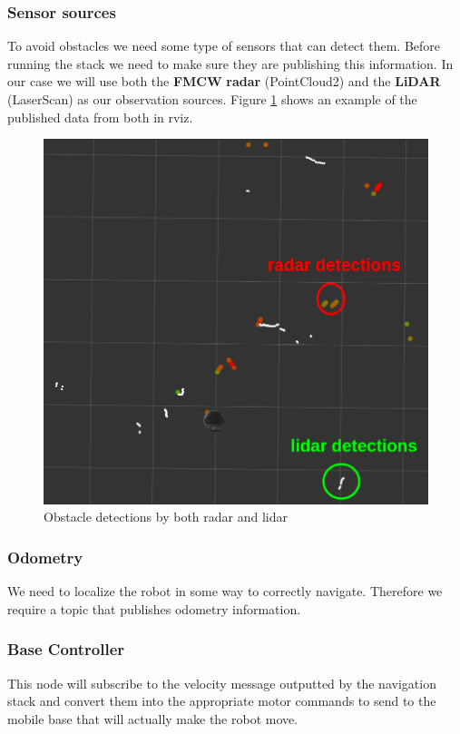 \subsubsection{Sensor sources}
To avoid obstacles we need some type of sensors that can detect them. Before running the stack we need to make sure they are publishing this information.
In our case we will use both the \textbf{\ac{FMCW}} \textbf{\ac{radar}} (PointCloud2) and the \textbf{\ac{LiDAR}} (LaserScan) as our observation sources.
Figure \ref{fig:sensors} shows an example of the published data from both in rviz.
\begin{figure}[!htb]
    \centering
    \includegraphics[scale=0.5]{imgs/chapter3/sensors2.png}
    \caption{Obstacle detections by both radar and lidar}
    \label{fig:sensors}
\end{figure}
\subsubsection{Odometry}
We need to localize the robot in some way to correctly navigate. Therefore we require a topic that publishes odometry information.
\subsubsection{Base Controller}
This node will subscribe to the velocity message outputted by the navigation stack and convert them into the appropriate motor commands to send to the mobile base that will actually make the robot move.
